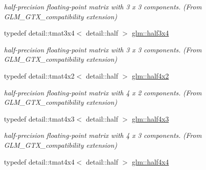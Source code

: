 \begin{DoxyCompactItemize}
\begin{DoxyCompactList}\small\item\em half-\/precision floating-\/point matrix with 3 x 3 components. (From G\+L\+M\+\_\+\+G\+T\+X\+\_\+compatibility extension) \end{DoxyCompactList}\item 
\hypertarget{group__gtx__compatibility_ga623bbede6f3bc2b56d24249b1d54b9ff}{}typedef detail\+::tmat3x4$<$ detail\+::half $>$ \hyperlink{group__gtx__compatibility_ga623bbede6f3bc2b56d24249b1d54b9ff}{glm\+::half3x4}\label{group__gtx__compatibility_ga623bbede6f3bc2b56d24249b1d54b9ff}

\begin{DoxyCompactList}\small\item\em half-\/precision floating-\/point matrix with 3 x 3 components. (From G\+L\+M\+\_\+\+G\+T\+X\+\_\+compatibility extension) \end{DoxyCompactList}\item 
\hypertarget{group__gtx__compatibility_gab3a33bb47725c125c91ca127965f3109}{}typedef detail\+::tmat4x2$<$ detail\+::half $>$ \hyperlink{group__gtx__compatibility_gab3a33bb47725c125c91ca127965f3109}{glm\+::half4x2}\label{group__gtx__compatibility_gab3a33bb47725c125c91ca127965f3109}

\begin{DoxyCompactList}\small\item\em half-\/precision floating-\/point matrix with 4 x 2 components. (From G\+L\+M\+\_\+\+G\+T\+X\+\_\+compatibility extension) \end{DoxyCompactList}\item 
\hypertarget{group__gtx__compatibility_ga1172a250a82ce81921e487c7dedda58a}{}typedef detail\+::tmat4x3$<$ detail\+::half $>$ \hyperlink{group__gtx__compatibility_ga1172a250a82ce81921e487c7dedda58a}{glm\+::half4x3}\label{group__gtx__compatibility_ga1172a250a82ce81921e487c7dedda58a}

\begin{DoxyCompactList}\small\item\em half-\/precision floating-\/point matrix with 4 x 3 components. (From G\+L\+M\+\_\+\+G\+T\+X\+\_\+compatibility extension) \end{DoxyCompactList}\item 
\hypertarget{group__gtx__compatibility_gabe2b7e1fdfbd6a101ca6e1506b95375a}{}typedef detail\+::tmat4x4$<$ detail\+::half $>$ \hyperlink{group__gtx__compatibility_gabe2b7e1fdfbd6a101ca6e1506b95375a}{glm\+::half4x4}\label{group__gtx__compatibility_gabe2b7e1fdfbd6a101ca6e1506b95375a}


\end{DoxyCompactItemize}
